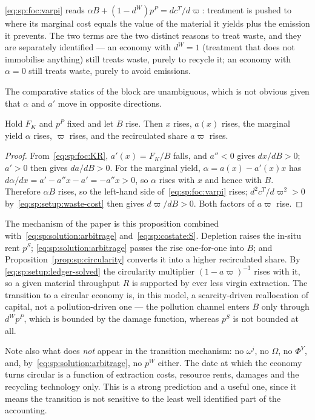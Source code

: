  \eqref{eq:sp:foc:varpi} reads
$\alpha B+\left(1-d^W\right)p^P=dc^T/d\varpi$: treatment is pushed to where its marginal cost equals
the value of the material it yields plus the emission it prevents. The two terms are the two
distinct reasons to treat waste, and they are separately identified --- an economy with $d^W=1$
(treatment that does not immobilise anything) still treats waste, purely to recycle it; an economy
with $\alpha=0$ still treats waste, purely to avoid emissions.

 The comparative statics of the block are unambiguous,
which is not obvious given that $\alpha$ and $a'$ move in opposite directions.

\begin{proposition}\label{prop:sp:circularity}
Hold $F_K$ and $p^P$ fixed and let $B$ rise. Then $x$ rises, $a(x)$ rises, the marginal yield
$\alpha$ rises, $\varpi$ rises, and the recirculated share $a\varpi$ rises.
\end{proposition}

\begin{proof}
From~\eqref{eq:sp:foc:KR}, $a'(x)=F_K/B$ falls, and $a''<0$ gives $dx/dB>0$; $a'>0$ then gives
$da/dB>0$. For the marginal yield, $\alpha=a(x)-a'(x)x$ has
$d\alpha/dx=a'-a''x-a'=-a''x>0$, so $\alpha$ rises with $x$ and hence with $B$. Therefore $\alpha B$
rises, so the left-hand side of~\eqref{eq:sp:foc:varpi} rises; $d^2c^T/d\varpi^2>0$
by~\eqref{eq:sp:setup:waste-cost} then gives $d\varpi/dB>0$. Both factors of $a\varpi$ rise.
\end{proof}

The mechanism of the paper is this proposition combined
with~\eqref{eq:sp:solution:arbitrage} and~\eqref{eq:sp:costate:S}. Depletion raises the in-situ rent
$p^S$; \eqref{eq:sp:solution:arbitrage} passes the rise one-for-one into $B$; and
Proposition~\ref{prop:sp:circularity} converts it into a higher recirculated share. By
\eqref{eq:sp:setup:ledger-solved} the circularity multiplier $\left(1-a\varpi\right)^{-1}$ rises with
it, so a given material throughput $R$ is supported by ever less virgin extraction. The transition
to a circular economy is, in this model, a scarcity-driven reallocation of capital, not a
pollution-driven one --- the pollution channel enters $B$ only through $d^Wp^P$, which is bounded by
the damage function, whereas $p^S$ is not bounded at all.

Note also what does \emph{not} appear in the transition mechanism: no $\omega^j$, no $\Omega$, no
$\Phi^Y$, and, by~\eqref{eq:sp:solution:arbitrage}, no $p^W$ either. The date at which the economy
turns circular is a function of extraction costs, resource rents, damages and the recycling
technology only. This is a strong prediction and a useful one, since it means the transition is not
sensitive to the least well identified part of the accounting.


